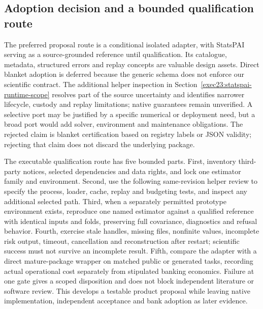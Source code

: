 \subsection{Adoption decision and a bounded qualification route}
\label{exec23:statspai-contract-decision}
The preferred proposal route is a conditional isolated adapter, with StatsPAI
serving as a source-grounded reference until qualification. Its catalogue,
metadata, structured errors and replay concepts are valuable design assets.
Direct blanket adoption is deferred because the generic schema does not enforce
our scientific contract. The additional helper inspection in Section~\ref{exec23:statspai-runtime-scope} resolves part of the source uncertainty and identifies narrower lifecycle, custody and replay limitations; native guarantees remain unverified.
A selective port may be justified by a specific numerical or deployment need,
but a broad port would add solver, environment and maintenance obligations.
The rejected claim is blanket certification based on registry labels or JSON
validity; rejecting that claim does not discard the underlying package.
\citep{exec23_statspai_contract}

The executable qualification route has five bounded parts. First, inventory
third-party notices, selected dependencies and data rights, and lock one
estimator family and environment. Second, use the following same-revision helper review to specify the process, loader, cache, replay and budgeting tests, and inspect any additional selected path. Third, when a
separately permitted prototype environment exists, reproduce one named estimator
against a qualified reference with identical inputs and folds, preserving full
covariance, diagnostics and refusal behavior. Fourth, exercise stale handles,
missing files, nonfinite values, incomplete risk output, timeout, cancellation
and reconstruction after restart; scientific success must not survive an
incomplete result. Fifth, compare the adapter with a direct mature-package
wrapper on matched public or generated tasks, recording actual operational
cost separately from stipulated banking economics. Failure at one gate gives
a scoped disposition and does not block independent literature or software
review. This develops a testable product proposal while leaving native
implementation, independent acceptance and bank adoption as later evidence.



